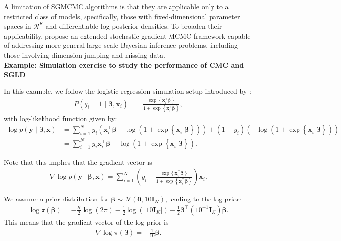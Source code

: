 A limitation of SGMCMC algorithms is that they are applicable only to a restricted class of models, specifically, those with fixed-dimensional parameter spaces in \( \mathcal{R}^K \) and differentiable log-posterior densities. To broaden their applicability, \cite{song2020extended} propose an extended stochastic gradient MCMC framework capable of addressing more general large-scale Bayesian inference problems, including those involving dimension-jumping and missing data.\\

\textbf{Example: Simulation exercise to study the performance of CMC and SGLD}

In this example, we follow the logistic regression simulation setup introduced by \cite{nemeth2021stochastic}:
\begin{align*}
	P(y_i = 1 \mid \boldsymbol{\beta}, \mathbf{x}_i) &= \frac{\exp\left\{\mathbf{x}_i^{\top} \boldsymbol{\beta}\right\}}{1 + \exp\left\{\mathbf{x}_i^{\top} \boldsymbol{\beta}\right\}},
\end{align*}
with log-likelihood function given by:
\begin{align*}
	\log p(\mathbf{y} \mid \boldsymbol{\beta}, \mathbf{x}) 
	&= \sum_{i=1}^N y_i \left( \mathbf{x}_i^{\top} \boldsymbol{\beta} - \log \left(1 + \exp\left\{\mathbf{x}_i^{\top} \boldsymbol{\beta}\right\} \right) \right) 
	+ (1 - y_i) \left( - \log \left(1 + \exp\left\{\mathbf{x}_i^{\top} \boldsymbol{\beta}\right\} \right) \right) \\
	&= \sum_{i=1}^N y_i \mathbf{x}_i^{\top} \boldsymbol{\beta} - \log \left(1 + \exp\left\{\mathbf{x}_i^{\top} \boldsymbol{\beta}\right\} \right).
\end{align*}

Note that this implies that the gradient vector is
\begin{align*}
	\nabla \log p(\mathbf{y} \mid \boldsymbol{\beta}, \mathbf{x}) = \sum_{i=1}^N \left(y_i - \frac{\exp\left\{\mathbf{x}_i^{\top} \boldsymbol{\beta}\right\}}{1+\exp\left\{\mathbf{x}_i^{\top} \boldsymbol{\beta}\right\}}\right)\mathbf{x}_i. 
\end{align*}

We assume a prior distribution for \( \boldsymbol{\beta} \sim \mathcal{N}(\mathbf{0}, 10 \mathbf{I}_K) \), leading to the log-prior:
\begin{align*}
	\log \pi(\boldsymbol{\beta}) = -\frac{K}{2} \log(2\pi) - \frac{1}{2} \log\left( \lvert 10 \mathbf{I}_K \rvert \right) - \frac{1}{2} \boldsymbol{\beta}^{\top} (10^{-1} \mathbf{I}_K) \boldsymbol{\beta}.
\end{align*}
This means that the gradient vector of the log-prior is
\begin{align*}
	\nabla \log \pi(\boldsymbol{\beta}) = -\frac{1}{10}\boldsymbol{\beta}. 
\end{align*}

